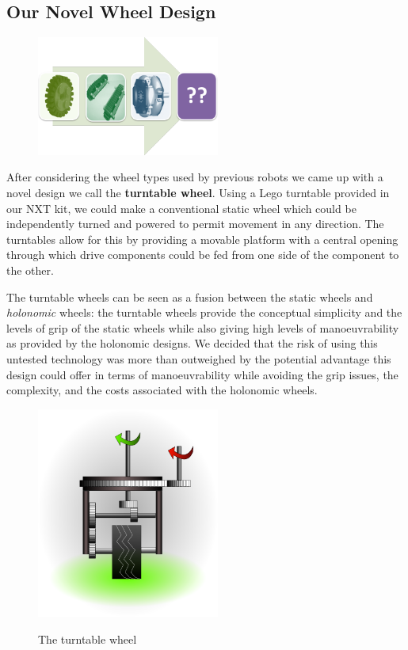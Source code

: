 \documentclass[12pt,a4paper,notitlepage,twocolumn]{report}
\begin{document}
\subsection*{Our Novel Wheel Design}

\begin{figure} [ht]
  \centering
  \includegraphics[width=60mm]{wheels.png}
  \label{fig:turntable}
\end{figure}

After considering the wheel types used by previous robots we came up
with a novel design we call the \textbf{turntable wheel}. Using a Lego
turntable provided in our NXT kit, we could make a conventional static
wheel which could be independently turned and powered to permit
movement in any direction. The turntables allow for this by providing
a movable platform with a central opening through which drive
components could be fed from one side of the component to the other.

The turntable wheels can be seen as a fusion between the static wheels
and {\em holonomic} wheels: the turntable wheels provide the
conceptual simplicity and the levels of grip of the static wheels
while also giving high levels of manoeuvrability as provided by the
holonomic designs. We decided that the risk of using this untested
technology was more than outweighed by the potential advantage this
design could offer in terms of manoeuvrability while avoiding the grip
issues, the complexity, and the costs associated with the holonomic
wheels.

\begin{figure} [ht]
  \centering
  \includegraphics[width=60mm]{turntable.png}
  \label{fig:turntable}
  \caption{The turntable wheel}
\end{figure}
\end{document}
